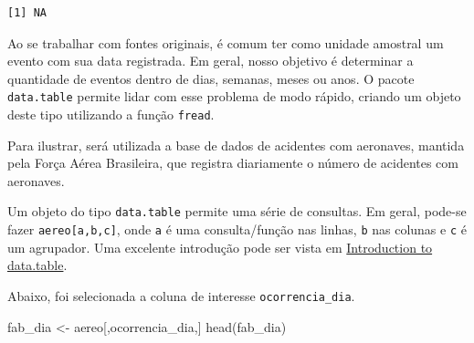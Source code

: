 \documentclass[
  letterpaper,
  DIV=11,
  numbers=noendperiod]{scrartcl}
\newenvironment{Shaded}{\begin{snugshade}}{\end{snugshade}}
\newcommand{\AttributeTok}[1]{\textcolor[rgb]{0.40,0.45,0.13}{#1}}
\newcommand{\FunctionTok}[1]{\textcolor[rgb]{0.28,0.35,0.67}{#1}}
\newcommand{\NormalTok}[1]{\textcolor[rgb]{0.00,0.23,0.31}{#1}}
\newcommand{\OtherTok}[1]{\textcolor[rgb]{0.00,0.23,0.31}{#1}}
\newcommand{\SpecialCharTok}[1]{\textcolor[rgb]{0.37,0.37,0.37}{#1}}
\newcommand{\StringTok}[1]{\textcolor[rgb]{0.13,0.47,0.30}{#1}}
\theoremstyle{plain}
\theoremstyle{plain}
\theoremstyle{definition}
\theoremstyle{definition}
\theoremstyle{remark}
\begin{document}
\begin{verbatim}
[1] NA
\end{verbatim}

Ao se trabalhar com fontes originais, é comum ter como unidade amostral
um evento com sua data registrada. Em geral, nosso objetivo é determinar
a quantidade de eventos dentro de dias, semanas, meses ou anos. O pacote
\texttt{data.table} permite lidar com esse problema de modo rápido,
criando um objeto deste tipo utilizando a função \texttt{fread}.

Para ilustrar, será utilizada a base de dados de acidentes com
aeronaves, mantida pela Força Aérea Brasileira, que registra diariamente
o número de acidentes com aeronaves.

\begin{Shaded}
\end{Shaded}

Um objeto do tipo \texttt{data.table} permite uma série de consultas. Em
geral, pode-se fazer \texttt{aereo{[}a,b,c{]}}, onde \texttt{a} é uma
consulta/função nas linhas, \texttt{b} nas colunas e \texttt{c} é um
agrupador. Uma excelente introdução pode ser vista em
\href{https://cran.r-project.org/web/packages/data.table/vignettes/datatable-intro.html}{Introduction
to data.table}.

Abaixo, foi selecionada a coluna de interesse \texttt{ocorrencia\_dia}.

\begin{Shaded}
\begin{Highlighting}[]
\NormalTok{fab\_dia }\OtherTok{\textless{}{-}}\NormalTok{ aereo[,}\StringTok{\textquotesingle{}ocorrencia\_dia\textquotesingle{}}\NormalTok{,]}
\FunctionTok{head}\NormalTok{(fab\_dia)}
\end{Highlighting}
\end{Shaded}
\end{document}
